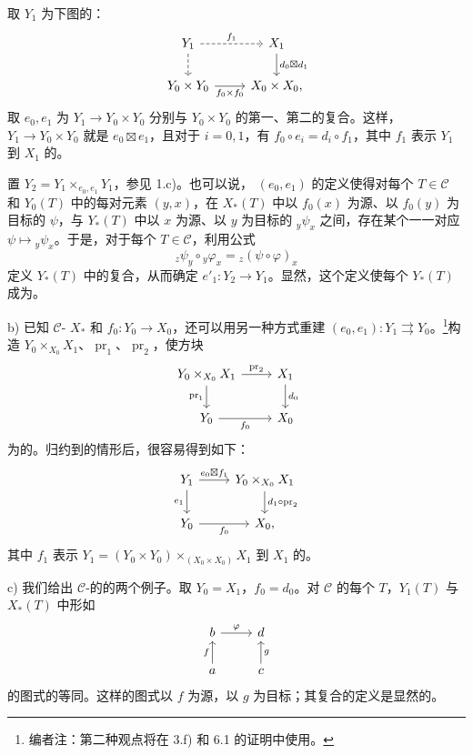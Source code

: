 取 $Y_1$ 为下图的：
\[
\begin{tikzcd}
Y_1\arrow[r,dashed,"f_1"]\arrow[d,dashed]&X_1\arrow[d,"d_0\boxtimes d_1"]\\
Y_0\times Y_0\arrow[r,"f_0\times f_0"']&X_0\times X_0,
\end{tikzcd}
\]
取 $e_0,e_1$ 为 $Y_1\to Y_0\times Y_0$ 分别与 $Y_0\times Y_0$ 的第一、第二的复合。这样， $Y_1\to Y_0\times Y_0$ 就是 $e_0\boxtimes e_1$，且对于 $i=0,1$，有 $f_0\circ e_i=d_i\circ f_1$，其中 $f_1$ 表示 $Y_1$ 到 $X_1$ 的。

置 $Y_2=Y_1\times_{e_0,e_1}Y_1$，参见 1.c)。也可以说， $(e_0,e_1)$ 的定义使得对每个 $T\in\mathcal C$ 和 $Y_0(T)$ 中的每对元素 $(y,x)$，在 $X_*(T)$ 中以 $f_0(x)$ 为源、以 $f_0(y)$ 为目标的 $\psi$，与 $Y_*(T)$ 中以 $x$ 为源、以 $y$ 为目标的 ${}_y\psi_x$ 之间，存在某个一一对应 $\psi\mapsto{}_y\psi_x$。于是，对于每个 $T\in\mathcal C$，利用公式
\[{}_z\psi_y\circ{}_y\varphi_x={}_z(\psi\circ\varphi)_x\]
定义 $Y_*(T)$ 中的复合，从而确定 $e'_1:Y_2\to Y_1$。显然，这个定义使每个 $Y_*(T)$ 成为。

b) 已知 $\mathcal C$- $X_*$ 和 $f_0:Y_0\to X_0$，还可以用另一种方式重建 $(e_0,e_1):Y_1\rightrightarrows Y_0$。\footnote{编者注：第二种观点将在 3.f) 和 6.1 的证明中使用。}构造 $Y_0\times_{X_0}X_1$、$\operatorname{pr}_1$、$\operatorname{pr}_2$，使方块
\[
\begin{tikzcd}
Y_0\times_{X_0}X_1\arrow[r,"\operatorname{pr}_2"]\arrow[d,"\operatorname{pr}_1"']&X_1\arrow[d,"d_0"]\\
Y_0\arrow[r,"f_0"']&X_0
\end{tikzcd}
\]
为的。归约到的情形后，很容易得到如下：
\[
\begin{tikzcd}
Y_1\arrow[r,"e_0\boxtimes f_1"]\arrow[d,"e_1"']&Y_0\times_{X_0}X_1\arrow[d,"d_1\circ\operatorname{pr}_2"]\\
Y_0\arrow[r,"f_0"']&X_0,
\end{tikzcd}
\]
其中 $f_1$ 表示 $Y_1=(Y_0\times Y_0)\times_{(X_0\times X_0)}X_1$ 到 $X_1$ 的。

c) 我们给出 $\mathcal C$-的的两个例子。取 $Y_0=X_1$，$f_0=d_0$。对 $\mathcal C$ 的每个 $T$，$Y_1(T)$ 与 $X_*(T)$ 中形如
\[
\begin{tikzcd}
b\arrow[r,"\varphi"]&d\\
a\arrow[u,"f"]&c\arrow[u,"g"']
\end{tikzcd}
\]
的图式的等同。这样的图式以 $f$ 为源，以 $g$ 为目标；其复合的定义是显然的。

